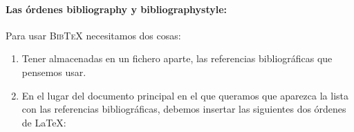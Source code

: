 \documentclass[a4paper,11pt]{article}
\def\btx-{\textsc{Bib\TeX}}
\def\ltx-{\LaTeX}
\begin{document}
\paragraph{Las órdenes bibliography y bibliographystyle:\\[\baselineskip]}
\label{sec:las-orden-bibl}

Para usar \btx- necesitamos dos cosas:

\begin{enumerate}

\item Tener  almacenadas en un fichero aparte,  las referencias bibliográficas
  que pensemos usar.

\item En el  lugar del documento principal en el que  queramos que aparezca la
  lista con  las referencias  bibliográficas, debemos insertar  las siguientes
  dos órdenes de \ltx-:

  {\small
\begin{verbatim}


\end{verbatim}
  }


\end{enumerate}
\end{document}
